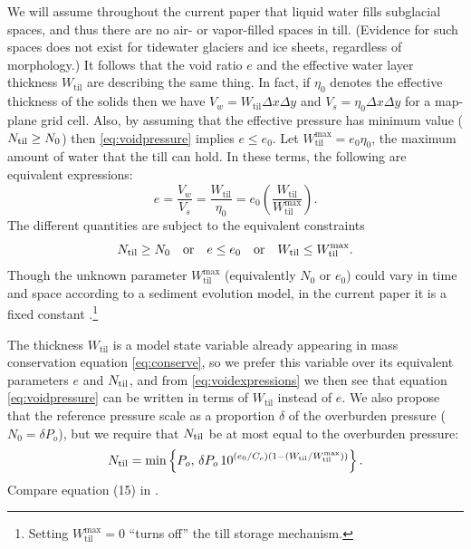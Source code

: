 \documentclass[gmd]{copernicus}   %
\newcommand{\text}{\textrm}
\newcommand{\Wtil}{W_{\text{til}}}
\newcommand{\Wtilmax}{W_{\text{til}}^{\text{max}}}
\begin{document}
We will assume throughout the current paper that liquid water fills subglacial spaces, and thus there are no air- or vapor-filled spaces in till.  (Evidence for such spaces does not exist for tidewater glaciers and ice sheets, regardless of morphology.)  It follows that the void ratio $e$ and the effective water layer thickness $\Wtil$ are describing the same thing.  In fact, if $\eta_0$ denotes the effective thickness of the solids then we have $V_w = \Wtil \Delta x \Delta y$ and $V_s = \eta_0 \Delta x \Delta y$ for a map-plane grid cell.  Also, by assuming that the effective pressure has minimum value ($\Ntil \ge N_0$) then \eqref{eq:voidpressure} implies $e \le e_0$.  Let $\Wtilmax = e_0 \eta_0$, the maximum amount of water that the till can hold.  In these terms, the following are equivalent expressions:
\begin{equation}
e = \frac{V_w}{V_s} = \frac{\Wtil}{\eta_0} = e_0 \left(\frac{\Wtil}{\Wtilmax}\right). \label{eq:voidexpressions}
\end{equation}
The different quantities are subject to the equivalent constraints
\begin{equation}
\Ntil \ge N_0 \quad \text{or} \quad e\le e_0 \quad \text{or} \quad \Wtil \le \Wtilmax. \label{eq:Wtilupperbound}
\end{equation}
Though the unknown parameter $\Wtilmax$ (equivalently $N_0$ or $e_0$) could vary in time and space according to a sediment evolution model, in the current paper it is a fixed constant \citep{BBssasliding,TrufferEchelmeyerHarrison2001}.\footnote{Setting $\Wtilmax=0$ ``turns off'' the till storage mechanism.}

The thickness $\Wtil$ is a model state variable already appearing in mass conservation equation \eqref{eq:conserve}, so we prefer this variable over its equivalent parameters $e$ and $\Ntil$, and from \eqref{eq:voidexpressions} we then see that equation \eqref{eq:voidpressure} can be written in terms of $\Wtil$ instead of $e$.  We also propose that the reference pressure scale as a proportion $\delta$ of the overburden pressure ($N_0 = \delta P_o$), but we require that $\Ntil$ be at most equal to the overburden pressure:
\begin{equation}
\Ntil = \min\left\{P_o,\, \delta P_o \, 10^{(e_0/C_c) \left(1 - (\Wtil/\Wtilmax)\right)}\right\}. \label{eq:Wtilpressure}
\end{equation}
Compare equation (15) in \cite{vanderWeletal2013}.
\end{document}
